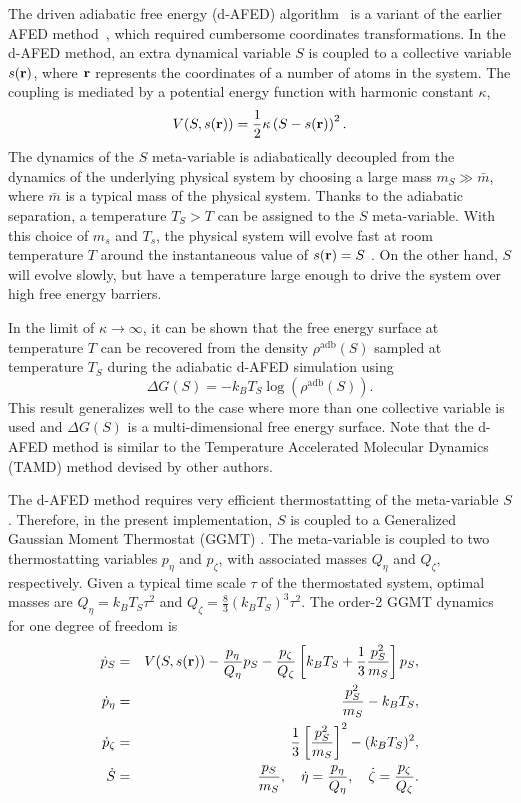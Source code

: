 \documentclass[12pt,fleqn]{report}
\begin{document}
The driven adiabatic free energy (d-AFED) algorithm~\cite{Abrams08} is a variant of the earlier AFED method~\cite{Rosso02a,Rosso02}, which required cumbersome coordinates transformations. In the d-AFED method, an extra dynamical variable $S$ is coupled to a collective variable $s({\bf r})$, where $\bf{r}$ represents the coordinates of a number of atoms in the system. The coupling is mediated by a potential energy function with harmonic constant $\kappa$, 
\begin{equation}
V(S, s({\bf r})) = \frac{1}{2} \kappa \left( S - s({\bf r}) \right)^2.
\end{equation}
The dynamics of the $S$ meta-variable is adiabatically decoupled from the dynamics of the underlying physical system by choosing a large mass $m_S \gg \bar{m}$, where $\bar{m}$ is a typical mass of the physical system. Thanks to the adiabatic separation, a temperature $T_S > T$ can be assigned to the $S$ meta-variable. With this choice of $m_s$ and $T_s$,  the physical system will evolve fast at room temperature $T$ around the instantaneous value of $s({\bf r}) = S$ . On the other hand, $S$  will evolve slowly, but have a temperature large enough to drive the system over high free energy barriers.

 In the limit of $\kappa \rightarrow \infty$, it can be shown that the free energy surface at temperature $T$ can be recovered from the density $\rho^\mathrm{adb}(S)$ sampled at temperature $T_S$ during the adiabatic d-AFED simulation using 
 \begin{equation}
 \Delta G(S) = -k_B T_S \log\left( \rho^\mathrm{adb}(S) \right).
 \end{equation}
 This result generalizes well to the case where more than one collective variable is used and $\Delta G(S)$ is a multi-dimensional free energy surface. Note that the d-AFED method is similar to the Temperature Accelerated Molecular Dynamics (TAMD) method devised by other authors\cite{Maragliano06}.
 
 The d-AFED method requires very efficient thermostatting of the meta-variable $S$. Therefore, in the present implementation, $S$ is coupled to a Generalized Gaussian Moment Thermostat (GGMT) \cite{Liu00}. The meta-variable is coupled to two thermostatting variables $p_\eta$ and $p_\zeta$, with associated masses $Q_\eta$ and $Q_\zeta$, respectively. Given a typical time scale $\tau$ of the thermostated system, optimal masses are $Q_\eta=k_BT_S \tau^2$ and $Q_\zeta=\frac{8}{3}(k_BT_S)^3 \tau^2$. The order-2 GGMT dynamics for one degree of freedom is
\begin{eqnarray} \label{ggmt1}
\dot{p}_S &=& V(S, s({\bf r})) -  \frac{p_\eta}{Q_\eta} p_S  - \frac{p_\zeta}{Q_\zeta} \left[ k_B T_S + \frac{1}{3} \frac{p_S^2}{m_S} \right] p_S, \\\dot{p}_\eta &=&  \frac{p_S^2}{m_S} - k_B T_S,  \\
\dot{p}_\zeta &=&     \frac{1}{3} \left[ \frac{p_S^2}{m_S} \right]^2 - (k_B T_S)^2, \\
\dot{S} &=& \frac{p_S}{m_S},  \quad  \dot{\eta} = \frac{p_\eta}{Q_\eta}, \quad    \dot{\zeta} = \frac{p_\zeta}{Q_\zeta}  \label{ggmt2}.
\end {eqnarray}
\end{document}
